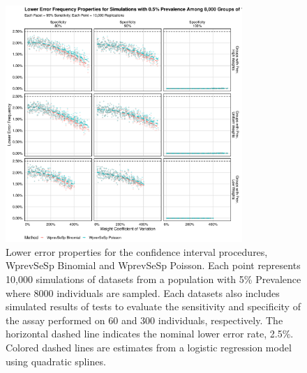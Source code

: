 \documentclass[AMA,STIX1COL]{WileyNJD-v2}
\begin{document}
\begin{figure}
\centering
\includegraphics[width=0.8\textwidth]{figures/imperfect_lower_error_frequency_8000_groups_0_005_prev.pdf}
\caption{Lower error properties for the confidence interval procedures, WprevSeSp Binomial and WprevSeSp Poisson.
Each point represents 10,000 simulations of datasets from a population with 5\% Prevalence where 8000 individuals are sampled.
Each datasets also includes simulated results of tests to evaluate the sensitivity and specificity of the assay performed on 60 and 300 individuals, respectively.
The horizontal dashed line indicates the nominal lower error rate, 2.5\%.
Colored dashed lines are estimates from a logistic regression model using quadratic splines.}
\label{fig:imperfect_lower_error_frequency_8000_groups_0_005_prev}
\end{figure}
\end{document}
